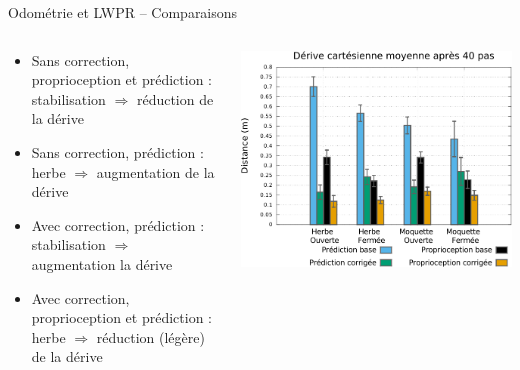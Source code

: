 \begin{frame}[noframenumbering]{Odométrie et LWPR -- Comparaisons}
    \begin{columns}
        \begin{column}{0.4\linewidth}
            \begin{itemize}
                \item Sans correction, proprioception et prédiction : 
                    stabilisation $\Rightarrow$ réduction de la dérive
                \item Sans correction, prédiction : 
                    herbe $\Rightarrow$ augmentation de la dérive
                \item Avec correction, prédiction : 
                    stabilisation $\Rightarrow$ augmentation la dérive
                \item Avec correction, proprioception et prédiction :
                    herbe $\Rightarrow$ réduction (légère) de la dérive
            \end{itemize}
        \end{column}
        \begin{column}{0.6\linewidth}
            \centering
            \includegraphics[type=pdf,ext=.pdf,read=.pdf,width=0.9\linewidth]{../plot/OdometryLWPR/comparison_values}
        \end{column}
    \end{columns}
\end{frame}


